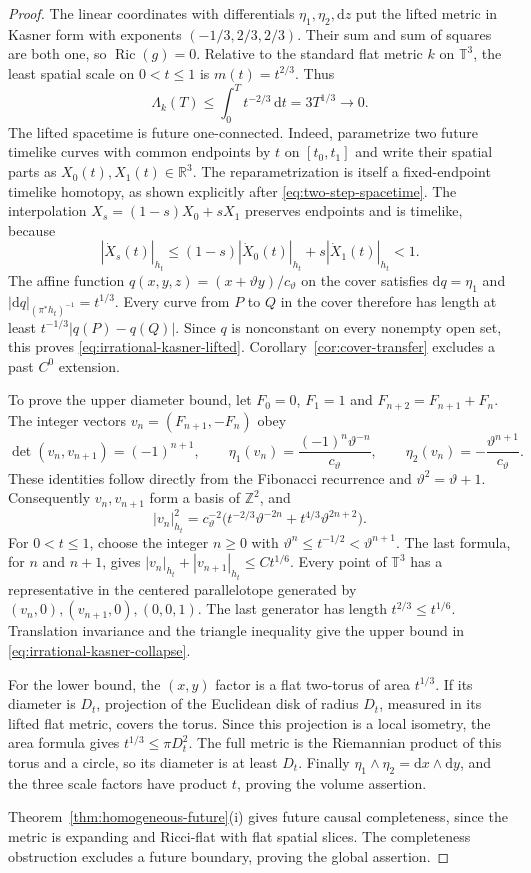\documentclass[10pt,a4paper]{article}
\numberwithin{equation}{section}
\theoremstyle{definition}
\theoremstyle{remark}
\newcommand{\R}{\mathbb R}
\newcommand{\dd}{\mathrm d}
\newcommand{\Ric}{\operatorname{Ric}}
\begin{document}
\begin{proof}
The linear coordinates with differentials $\eta_1,\eta_2,\dd z$ put the
lifted metric in Kasner form with exponents $(-1/3,2/3,2/3)$.  Their sum
and sum of squares are both one, so $\Ric(g)=0$.  Relative to the standard
flat metric $k$ on $\mathbb T^3$, the least spatial scale on $0<t\le1$
is $m(t)=t^{2/3}$.  Thus
\[
 \Lambda_k(T)\le\int_0^Tt^{-2/3}\,\dd t=3T^{1/3}\longrightarrow0.
\]
The lifted spacetime is future one-connected.  Indeed, parametrize two
future timelike curves with common endpoints by $t$ on $[t_0,t_1]$ and
write their spatial parts as $X_0(t),X_1(t)\in\R^3$.
The reparametrization is itself a fixed-endpoint timelike homotopy, as
shown explicitly after \eqref{eq:two-step-spacetime}.  The interpolation
$X_s=(1-s)X_0+sX_1$ preserves endpoints and is timelike, because
\[
 |\dot X_s(t)|_{h_t}
 \le(1-s)|\dot X_0(t)|_{h_t}+s|\dot X_1(t)|_{h_t}<1.
\]
The affine function $q(x,y,z)=(x+\vartheta y)/c_\vartheta$ on the cover
satisfies $\dd q=\eta_1$ and
$|\dd q|_{(\pi^*h_t)^{-1}}=t^{1/3}$.  Every curve from $P$ to $Q$ in
the cover therefore has length at least $t^{-1/3}|q(P)-q(Q)|$.
Since $q$ is nonconstant on every nonempty open set, this proves
\eqref{eq:irrational-kasner-lifted}.  Corollary~\ref{cor:cover-transfer}
excludes a past $C^0$ extension.

To prove the upper diameter bound, let $F_0=0$, $F_1=1$ and
$F_{n+2}=F_{n+1}+F_n$.  The integer vectors
$v_n=(F_{n+1},-F_n)$ obey
\[
 \det(v_n,v_{n+1})=(-1)^{n+1},\qquad
 \eta_1(v_n)=\frac{(-1)^n\vartheta^{-n}}{c_\vartheta},\qquad
 \eta_2(v_n)=-\frac{\vartheta^{n+1}}{c_\vartheta}.
\]
These identities follow directly from the Fibonacci recurrence and
$\vartheta^2=\vartheta+1$.  Consequently $v_n,v_{n+1}$ form a basis
of $\mathbb Z^2$, and
\[
 |v_n|_{h_t}^2
 =c_\vartheta^{-2}\bigl(t^{-2/3}\vartheta^{-2n}
                +t^{4/3}\vartheta^{2n+2}\bigr).
\]
For $0<t\le1$, choose the integer $n\ge0$ with
$\vartheta^n\le t^{-1/2}<\vartheta^{n+1}$.  The last formula, for
$n$ and $n+1$, gives $|v_n|_{h_t}+|v_{n+1}|_{h_t}\le C t^{1/6}$.
Every point of $\mathbb T^3$ has a representative in the centered
parallelotope generated by $(v_n,0),(v_{n+1},0),(0,0,1)$.
The last generator has length $t^{2/3}\le t^{1/6}$.
Translation invariance and the triangle inequality give the upper bound
in \eqref{eq:irrational-kasner-collapse}.

For the lower bound, the $(x,y)$ factor is a flat two-torus of area
$t^{1/3}$.  If its diameter is $D_t$, projection of the Euclidean disk
of radius $D_t$, measured in its lifted flat metric, covers the torus.
Since this projection is a local isometry, the area formula gives
$t^{1/3}\le\pi D_t^2$.  The full metric is the Riemannian product of
this torus and a circle, so its diameter is at least $D_t$.
Finally $\eta_1\wedge\eta_2=\dd x\wedge\dd y$, and the three scale
factors have product $t$, proving the volume assertion.

Theorem~\ref{thm:homogeneous-future}\textup{(i)} gives future causal
completeness, since the metric is expanding and Ricci-flat with flat
spatial slices.  The completeness obstruction \cite{GLS2018} excludes
a future boundary, proving the global assertion.
\end{proof}
\end{document}
